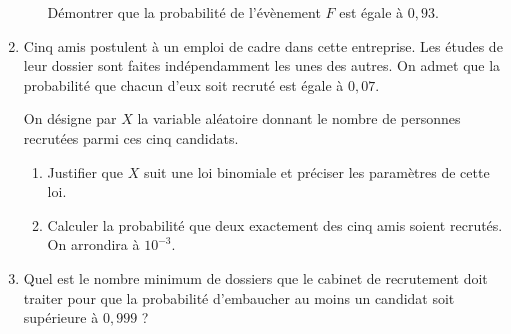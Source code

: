 \begin{enumerate}
\begin{enumerate}[label=\alph*.]
          Démontrer que la probabilité de l'évènement $F$ est égale à $0,93$.
     \end{enumerate}
     \item
     Cinq amis postulent à un emploi de cadre dans cette entreprise. Les études de leur dossier sont faites indépendamment les unes des autres. On admet que la probabilité que chacun d'eux soit recruté est égale à $0,07$.
     \par
     On désigne par $X$ la variable aléatoire donnant le nombre de personnes recrutées parmi ces cinq candidats.
     \begin{enumerate}[label=\alph*.]
          \item
          Justifier que $X$ suit une loi binomiale et préciser les paramètres de cette loi.
          \item
          Calculer la probabilité que deux exactement des cinq amis soient recrutés. On arrondira à $10^{-3}$.
     \end{enumerate}
     \item
     Quel est le nombre minimum de dossiers que le cabinet de recrutement doit traiter pour que la probabilité d'embaucher au moins un candidat soit supérieure à $0,999$ ?
\end{enumerate}
